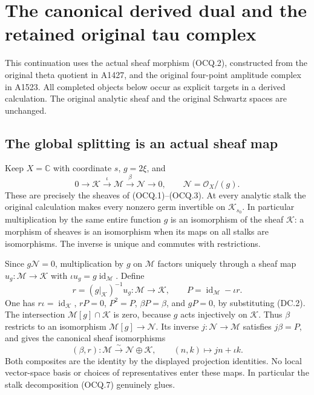 \section{The canonical derived dual and the retained original tau complex}
\label{CFStage:sec:canonical-coherent-bidual}

This continuation uses the actual sheaf morphism (OCQ.2), constructed
from the original theta quotient in A1427, and the original four-point
amplitude complex in A1523.  All completed objects below occur as
explicit targets in a derived calculation.  The original analytic
sheaf and the original Schwartz spaces are unchanged.

\subsection{The global splitting is an actual sheaf map}

Keep $X=\mathbb C$ with coordinate $s$, $g=2\xi$, and
\[
 0\longrightarrow\mathcal K\xrightarrow{\iota}\mathcal M
 \xrightarrow{\beta}\mathcal N\longrightarrow0,
 \qquad \mathcal N=\mathcal O_X/(g).
 \tag{DC.1}
\]
These are precisely the sheaves of (OCQ.1)--(OCQ.3).  At every
analytic stalk the original calculation makes every nonzero germ
invertible on $\mathcal K_{s_0}$.  In particular multiplication by
the same entire function $g$ is an isomorphism of the sheaf
$\mathcal K$: a morphism of sheaves is an isomorphism when its maps
on all stalks are isomorphisms.  The inverse is unique and commutes
with restrictions.

Since $g\mathcal N=0$, multiplication by $g$ on $\mathcal M$ factors
uniquely through a sheaf map $u_g:\mathcal M\to\mathcal K$ with
$\iota u_g=g\operatorname{id}_{\mathcal M}$.  Define
\[
 r=(g|_{\mathcal K})^{-1}u_g:\mathcal M\longrightarrow\mathcal K,
 \qquad P=\operatorname{id}_{\mathcal M}-\iota r.
 \tag{DC.2}
\]
One has $r\iota=\operatorname{id}_{\mathcal K}$, $rP=0$,
$P^2=P$, $\beta P=\beta$, and $gP=0$, by substituting (DC.2).
The intersection $\mathcal M[g]\cap\mathcal K$ is zero, because
$g$ acts injectively on $\mathcal K$.  Thus $\beta$ restricts to an
isomorphism $\mathcal M[g]\to\mathcal N$.  Its inverse
$j:\mathcal N\to\mathcal M$ satisfies $j\beta=P$, and gives the
canonical sheaf isomorphisms
\[
 (\beta,r):\mathcal M\xrightarrow{\sim}\mathcal N\oplus\mathcal K,
 \qquad (n,k)\longmapsto jn+\iota k.
 \tag{DC.3}
\]
Both composites are the identity by the displayed projection identities.
No local vector-space basis or choices of representatives enter these
maps.  In particular the stalk decomposition (OCQ.7) genuinely glues.

